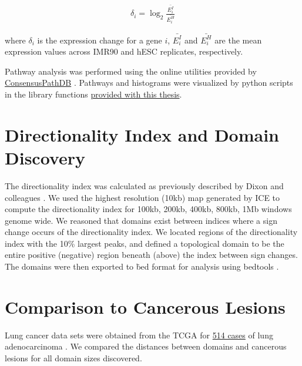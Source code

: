 \begin{align}
  \delta_i = \log_2{\frac{\bar{E_i^I}}{\bar{E_i^H}}}
\end{align}

where $\delta_i$ is the expression change for a gene $i$, $\bar{E_i^I}$ and $\bar{E_i^H}$ are the mean expression values across
IMR90 and hESC replicates, respectively.

Pathway analysis was performed using the online utilities provided by \href{http://consensuspathdb.org/}{ConsensusPathDB} \citep{kamburov2012}.
Pathways and histograms were visualized by python scripts in the library functions
\href{https://github.com/New-College-of-Florida/Jonathan-Niles-Thesis}{provided with this thesis}.

\section*{Directionality Index and Domain Discovery}

The directionality index was calculated as previously described by Dixon and colleagues \citep{dixon2012}.  We used the highest
resolution (10kb) map generated by \gls{ICE} to compute the directionality index for 100kb, 200kb, 400kb, 800kb, 1Mb windows
genome wide.  We reasoned that domains exist between indices where a sign change occurs of the directionality index.  We located
regions of the directionality index with the 10\% largest peaks, and defined a topological domain to be the entire positive (negative)
region beneath (above) the index between sign changes.   The domains were then exported to \.bed format for analysis using
bedtools \citep{quinlan2010,dale2011}.

\section*{Comparison to Cancerous Lesions}

Lung cancer data sets were obtained from the \gls{TCGA} for
\href{https://tcga-data.nci.nih.gov/tcga/tcgaCancerDetails.jsp?diseaseType=LUAD&diseaseName=Lung\%20adenocarcinoma}{514 cases}
of lung adenocarcinoma \citep{cerami2012,gao2013}.  We compared the distances between domains and cancerous lesions for all domain
sizes discovered.
